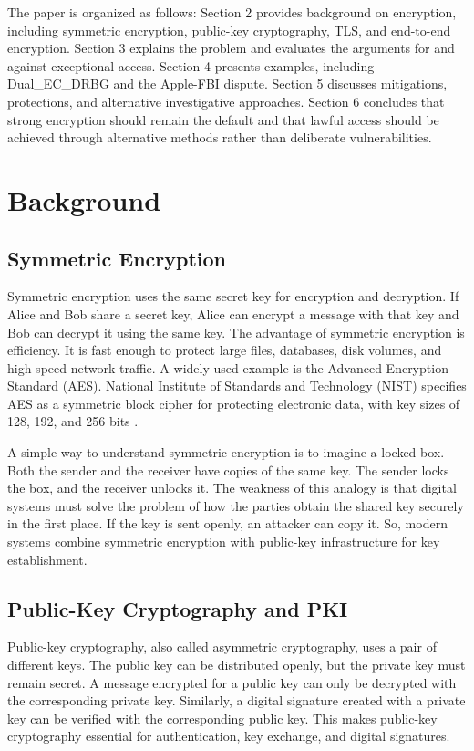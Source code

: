 \documentclass{easychair}
\begin{document}
The paper is organized as follows: Section 2 provides background on encryption, including symmetric encryption, public-key cryptography, TLS, and end-to-end encryption. Section 3 explains the problem and evaluates the arguments for and against exceptional access. Section 4 presents examples, including Dual\_EC\_DRBG and the Apple-FBI dispute. Section 5 discusses mitigations, protections, and alternative investigative approaches. Section 6 concludes that strong encryption should remain the default and that lawful access should be achieved through alternative methods rather than deliberate vulnerabilities.

\section{Background}

\subsection{Symmetric Encryption}

Symmetric encryption uses the same secret key for encryption and decryption. If Alice and Bob share a secret key, Alice can encrypt a message with that key and Bob can decrypt it using the same key. The advantage of symmetric encryption is efficiency. It is fast enough to protect large files, databases, disk volumes, and high-speed network traffic. A widely used example is the Advanced Encryption Standard (AES). National Institute of Standards and Technology (NIST) specifies AES as a symmetric block cipher for protecting electronic data, with key sizes of 128, 192, and 256 bits \cite{nist_aes}.

A simple way to understand symmetric encryption is to imagine a locked box. Both the sender and the receiver have copies of the same key. The sender locks the box, and the receiver unlocks it. The weakness of this analogy is that digital systems must solve the problem of how the parties obtain the shared key securely in the first place. If the key is sent openly, an attacker can copy it. So, modern systems combine symmetric encryption with public-key infrastructure for key establishment.

\subsection{Public-Key Cryptography and PKI}

Public-key cryptography, also called asymmetric cryptography, uses a pair of different keys. The public key can be distributed openly, but the private key must remain secret. A message encrypted for a public key can only be decrypted with the corresponding private key. Similarly, a digital signature created with a private key can be verified with the corresponding public key. This makes public-key cryptography essential for authentication, key exchange, and digital signatures.
\end{document}
